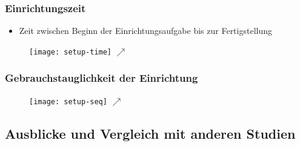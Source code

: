 \begin{frame}
    \frametitle{Einrichtungszeit}
    \begin{itemize}
        \item Zeit zwischen Beginn der Einrichtungsaufgabe bis zur Fertigstellung
    \end{itemize}
    \begin{figure}[c]
        \texttt{[image: setup-time]}
        \(\nearrow \)
    \end{figure}

\end{frame}

\begin{frame}
    \frametitle{Gebrauchstauglichkeit der Einrichtung}

    \begin{figure}[c]
        \texttt{[image: setup-seq]}
        \(\nearrow \)
    \end{figure}

\end{frame}

\subsection{Ausblicke und Vergleich mit anderen Studien}
\begin{frame}
    \frametitle{\currentsectionname}

\end{frame}
